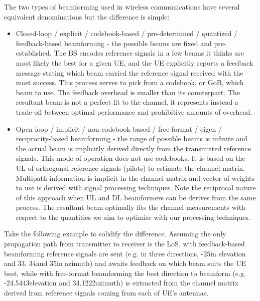 The two types of beamforming used in wireless communications have several equivalent denominations but the difference is simple:
\begin{itemize}
    \item Closed-loop / explicit / codebook-based / pre-determined / quantized / feedback-based beamforming - the possible beams are fixed and pre-established. The \ac{BS} encodes reference signals in a few beams it thinks are most likely the best for a given \ac{UE}, and the \ac{UE} explicitly reports a feedback message stating which beam carried the reference signal received with the most success. This process serves to pick from a codebook, or \ac{GoB}, which beam to use. The feedback overhead is smaller than its counterpart. The resultant beam is not a perfect fit to the channel, it represents instead a trade-off between optimal performance and prohibitive amounts of overhead. 
    \item Open-loop / implicit / non-codebook-based / free-format / eigen / reciprocity-based beamforming - the range of possible beams is infinite and the actual beam is implicitly derived directly from the transmitted reference signals. This mode of operation does not use codebooks. It is based on the \ac{UL} of orthogonal reference signals (pilots) to estimate the channel matrix. Multipath information is implicit in the channel matrix and vector of weights to use is derived with signal processing techniques. Note the reciprocal nature of this approach when \ac{UL} and \ac{DL} beamformers can be derives from the same process. The resultant beam optimally fits the channel measurements with respect to the quantities we aim to optimise with our processing techniques.
\end{itemize}

Take the following example to solidify the difference. Assuming the only propagation path from transmitter to receiver is the \ac{LoS}, with feedback-based beamforming reference signals are sent (e.g. in three directions, -25\tdeg in elevation and 33\tdeg, 34\tdeg and 35\tdeg in azimuth) and awaits feedback on which beam suits the \ac{UE} best, while with free-format beamforming the best direction to beamform (e.g. -24.5443\tdeg elevation and 34.1222\tdeg azimuth) is extracted from the channel matrix derived from reference signals coming from each of UE's antennas.

